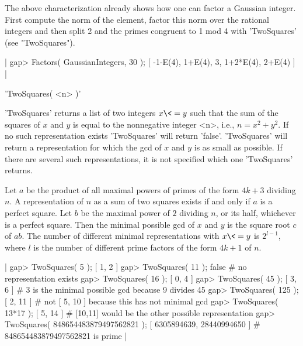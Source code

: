 The  above characterization already shows  how one  can factor a Gaussian
integer.  First  compute the norm of the  element, factor this  norm over
the rational integers and then split 2 and the  primes congruent to 1 mod
4 with 'TwoSquares' (see "TwoSquares").

|    gap> Factors( GaussianIntegers, 30 );
    [ -1-E(4), 1+E(4), 3, 1+2*E(4), 2+E(4) ] |

%

'TwoSquares( <n> )'

'TwoSquares' returns a list of two integers $x\<=y$  such that the sum of
the squares of $x$ and $y$ is equal to the nonnegative integer <n>, i.e.,
$n = x^2+y^2$.  If no such representation exists 'TwoSquares' will return
'false'.  'TwoSquares' will return a representation  for which the gcd of
$x$ and  $y$  is  as small  as  possible.    If there are    several such
representations, it is not specified which one 'TwoSquares' returns.

Let $a$ be the product of all maximal powers of primes of the form $4k+3$
dividing  $n$.  A representation of $n$ as a sum of two squares exists if
and only if $a$ is a perfect square.  Let $b$ be the maximal power of $2$
dividing  $n$, or  its  half, whichever is a  perfect  square.   Then the
minimal possible gcd of $x$ and $y$ is the square root $c$ of $a b$.  The
number  of  different minimal representations with $x\<=y$  is $2^{l-1}$,
where $l$ is the number of different prime factors  of the form $4k+1$ of
$n$.

|    gap> TwoSquares( 5 );
    [ 1, 2 ]
    gap> TwoSquares( 11 );
    false        # no representation exists
    gap> TwoSquares( 16 );
    [ 0, 4 ]
    gap> TwoSquares( 45 );
    [ 3, 6 ]        # 3 is the minimal possible gcd because 9 divides 45
    gap> TwoSquares( 125 );
    [ 2, 11 ]        # not [ 5, 10 ] because this has not minimal gcd
    gap> TwoSquares( 13*17 );
    [ 5, 14 ]        # [10,11] would be the other possible representation
    gap> TwoSquares( 848654483879497562821 );
    [ 6305894639, 28440994650 ]        # 848654483879497562821 is prime |




